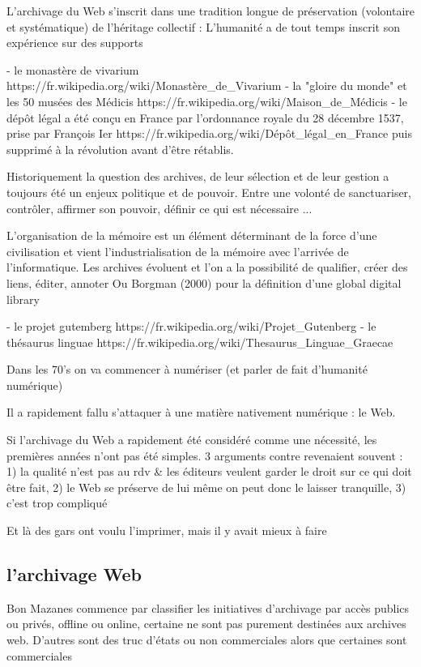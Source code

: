 \documentclass[symmetric,justified,marginals=raggedouter]{tufte-book}
\begin{document}
L'archivage du Web s'inscrit dans une tradition longue de préservation (volontaire et systématique) de l'héritage collectif :
L'humanité a de tout temps inscrit son expérience sur des supports 

- le monastère de vivarium https://fr.wikipedia.org/wiki/Monastère\_de\_Vivarium
- la "gloire du monde" et les 50 musées des Médicis  https://fr.wikipedia.org/wiki/Maison\_de\_Médicis
- le dépôt légal a été conçu en France par l'ordonnance royale du 28 décembre 1537, prise par François Ier https://fr.wikipedia.org/wiki/Dépôt\_légal\_en\_France puis supprimé à la révolution avant d'être rétablis. 

Historiquement la question des archives, de leur sélection et de leur gestion a toujours été un enjeux politique et de pouvoir. Entre une volonté de sanctuariser, contrôler, affirmer son pouvoir, définir ce qui est nécessaire ... 

L'organisation de la mémoire est un élément déterminant de la force d'une civilisation \citep{stiegler_les_1990} et vient l'industrialisation de la mémoire avec l'arrivée de l'informatique. Les archives évoluent \citep{stiegler_etat_1991} et l'on a la possibilité de qualifier, créer des liens, éditer, annoter 
Ou Borgman (2000) pour la définition d'une global digital library

- le projet gutemberg https://fr.wikipedia.org/wiki/Projet\_Gutenberg
- le thésaurus linguae https://fr.wikipedia.org/wiki/Thesaurus\_Linguae\_Graecae

Dans les 70's on va commencer à numériser (et parler de fait d'humanité numérique)

Il a rapidement fallu s'attaquer à une matière nativement numérique : le Web. 

Si l'archivage du Web a rapidement été considéré comme une nécessité, les premières années n'ont pas été simples. 3 arguments contre revenaient souvent : 1) la qualité n'est pas au rdv \& les éditeurs veulent garder le droit sur ce qui doit être fait, 2) le Web se préserve de lui même on peut donc le laisser tranquille, 3) c'est trop compliqué 

Et là des gars ont voulu l'imprimer, mais il y avait mieux à faire 

\subsection{l'archivage Web}

Bon Mazanes commence par classifier les initiatives d'archivage par accès publics ou privés, offline ou online, certaine ne sont pas purement destinées aux archives web. D'autres sont des truc d'états ou non commerciales alors que certaines sont commerciales 
\end{document}
